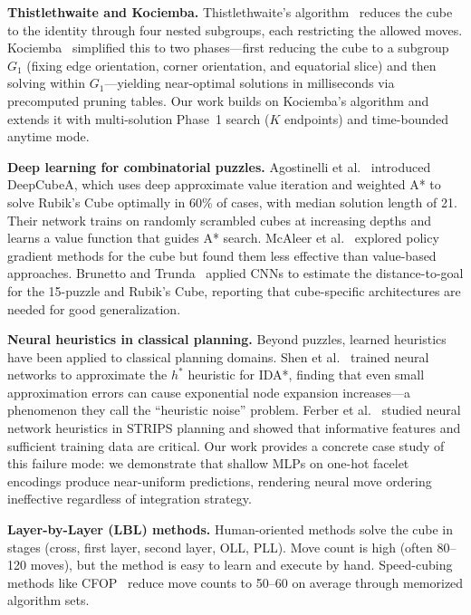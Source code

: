 \documentclass[10pt,twocolumn,a4paper]{article}
\begin{document}
\textbf{Thistlethwaite and Kociemba.}
Thistlethwaite's algorithm~\cite{thistlethwaite1981} reduces the cube to the identity through four nested subgroups, each restricting the allowed moves.  Kociemba~\cite{kociemba} simplified this to two phases---first reducing the cube to a subgroup $G_1$ (fixing edge orientation, corner orientation, and equatorial slice) and then solving within $G_1$---yielding near-optimal solutions in milliseconds via precomputed pruning tables.  Our work builds on Kociemba's algorithm and extends it with multi-solution Phase~1 search ($K$ endpoints) and time-bounded anytime mode.

\textbf{Deep learning for combinatorial puzzles.}
Agostinelli et al.~\cite{deepcubea} introduced DeepCubeA, which uses deep approximate value iteration and weighted A* to solve Rubik's Cube optimally in 60\% of cases, with median solution length of 21.  Their network trains on randomly scrambled cubes at increasing depths and learns a value function that guides A* search.  McAleer et al.~\cite{mcaleer2018} explored policy gradient methods for the cube but found them less effective than value-based approaches.  Brunetto and Trunda~\cite{brunetto2017} applied CNNs to estimate the distance-to-goal for the 15-puzzle and Rubik's Cube, reporting that cube-specific architectures are needed for good generalization.

\textbf{Neural heuristics in classical planning.}
Beyond puzzles, learned heuristics have been applied to classical planning domains.  Shen et al.~\cite{shen2020} trained neural networks to approximate the $h^*$ heuristic for IDA*, finding that even small approximation errors can cause exponential node expansion increases---a phenomenon they call the ``heuristic noise'' problem.  Ferber et al.~\cite{ferber2022} studied neural network heuristics in STRIPS planning and showed that informative features and sufficient training data are critical.  Our work provides a concrete case study of this failure mode: we demonstrate that shallow MLPs on one-hot facelet encodings produce near-uniform predictions, rendering neural move ordering ineffective regardless of integration strategy.

\textbf{Layer-by-Layer (LBL) methods.}
Human-oriented methods solve the cube in stages (cross, first layer, second layer, OLL, PLL).  Move count is high (often 80--120 moves), but the method is easy to learn and execute by hand.  Speed-cubing methods like CFOP~\cite{fridrich} reduce move counts to 50--60 on average through memorized algorithm sets.
\end{document}
